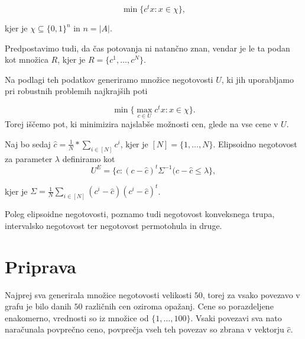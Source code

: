 \documentclass[a4paper, 12 pt]{article}
\theoremstyle{definition} %
\theoremstyle{plain} %
\theoremstyle{definition}
\begin{document}
\begin{equation*}
\min \{c^t x : x \in \chi \},
\end{equation*}

kjer je $\chi \subseteq \{0,1\}^n$ in $n = |A|$.\newline

Predpostavimo tudi, da čas potovanja ni natančno znan, vendar je le ta podan kot množica $R$, kjer je $R = \{c^1, \dots, c^N \}$.\newline

Na podlagi teh podatkov generiramo množice negotovosti $U$, ki jih uporabljamo pri robustnih problemih najkrajših poti

\begin{equation*}
\min \{\max \limits_{c \in U} c^t x : x \in \chi \}.
\end{equation*}
 Torej iščemo pot, ki minimizira najslabše možnosti cen, glede na vse cene v $U$.

\bigskip

Naj bo sedaj $\hat{c} = \frac{1}{N} * \sum_{i \in [N]} c^i $, kjer je $[N] = \{1, \dots , N \}$. Elipsoidno negotovost za parameter $\lambda$ definiramo kot
\begin{equation*}
U^E = \{c: (c - \hat{c})^t \Sigma ^{-1} (c - \hat{c}	\le \lambda \},
\end{equation*}

kjer je $\Sigma = \frac{1}{N} \sum_{i \in [N]} (c^i -\hat{c}) (c^i -\hat{c})^t$.

\bigskip
Poleg elipsoidne negotovosti, poznamo tudi negotovost konveksnega trupa, intervalsko negotovost ter negotovost permotohula in druge. 
\pagebreak


\section{Priprava}

Najprej sva generirala množice negotovosti velikosti $50$, torej za vsako povezavo v grafu je bilo danih $50$ različnih cen oziroma opažanj. Cene so porazdeljene enakomerno, vrednosti so iz množice od $\{1, \dots , 100\} $. Vsaki povezavi sva nato naračunala povprečno ceno, povprečja vseh teh povezav so zbrana v vektorju $\hat{c}$.\newline
\end{document}
